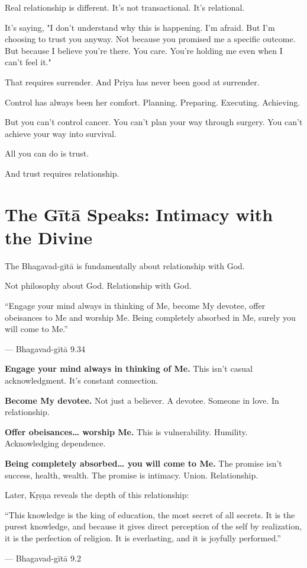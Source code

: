 \documentclass[11pt,twoside]{book}
\begin{document}
Real relationship is different. It's not transactional. It's relational.

It's saying, "I don't understand why this is happening. I'm afraid. But I'm choosing to trust you anyway. Not because you promised me a specific outcome. But because I believe you're there. You care. You're holding me even when I can't feel it."

That requires surrender. And Priya has never been good at surrender.

Control has always been her comfort. Planning. Preparing. Executing. Achieving.

But you can't control cancer. You can't plan your way through surgery. You can't achieve your way into survival.

All you can do is trust.

And trust requires relationship.

\section*{The Gītā Speaks: Intimacy with the Divine}

The Bhagavad-gītā is fundamentally about relationship with God.

Not philosophy about God. Relationship with God.

\begin{pullquote}
``Engage your mind always in thinking of Me, become My devotee, offer obeisances to Me and worship Me. Being completely absorbed in Me, surely you will come to Me.''

--- Bhagavad-gītā 9.34
\end{pullquote}

\textbf{\textbf{Engage your mind always in thinking of Me.}} This isn't casual acknowledgment. It's constant connection.

\textbf{\textbf{Become My devotee.}} Not just a believer. A devotee. Someone in love. In relationship.

\textbf{\textbf{Offer obeisances\ldots{} worship Me.}} This is vulnerability. Humility. Acknowledging dependence.

\textbf{\textbf{Being completely absorbed\ldots{} you will come to Me.}} The promise isn't success, health, wealth. The promise is intimacy. Union. Relationship.

Later, Kṛṣṇa reveals the depth of this relationship:

\begin{pullquote}
``This knowledge is the king of education, the most secret of all secrets. It is the purest knowledge, and because it gives direct perception of the self by realization, it is the perfection of religion. It is everlasting, and it is joyfully performed.''

--- Bhagavad-gītā 9.2
\end{pullquote}
\end{document}
